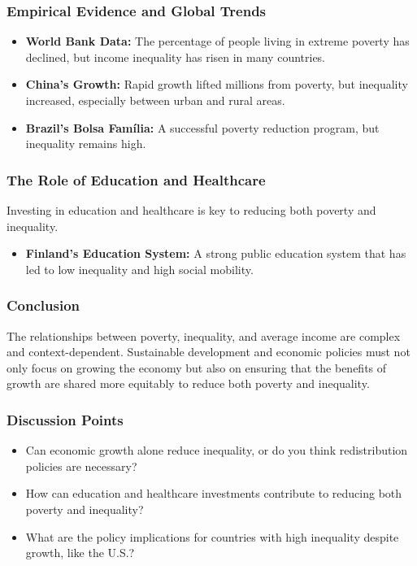 \documentclass{beamer}
\begin{document}
\begin{frame}
\frametitle{Empirical Evidence and Global Trends}
\begin{itemize}
    \item \textbf{World Bank Data:} The percentage of people living in extreme poverty has declined, but income inequality has risen in many countries.
    \item \textbf{China's Growth:} Rapid growth lifted millions from poverty, but inequality increased, especially between urban and rural areas.
    \item \textbf{Brazil's Bolsa Família:} A successful poverty reduction program, but inequality remains high.
\end{itemize}
\end{frame}

\begin{frame}
\frametitle{The Role of Education and Healthcare}
Investing in education and healthcare is key to reducing both poverty and inequality.
\begin{itemize}
    \item \textbf{Finland’s Education System:} A strong public education system that has led to low inequality and high social mobility.
\end{itemize}
\end{frame}

\begin{frame}
\frametitle{Conclusion}
The relationships between poverty, inequality, and average income are complex and context-dependent. Sustainable development and economic policies must not only focus on growing the economy but also on ensuring that the benefits of growth are shared more equitably to reduce both poverty and inequality.
\end{frame}

\begin{frame}
\frametitle{Discussion Points}
\begin{itemize}
    \item Can economic growth alone reduce inequality, or do you think redistribution policies are necessary?
    \item How can education and healthcare investments contribute to reducing both poverty and inequality?
    \item What are the policy implications for countries with high inequality despite growth, like the U.S.?
\end{itemize}
\end{frame}
\end{document}
